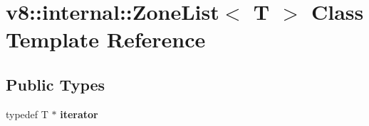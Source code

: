 \hypertarget{classv8_1_1internal_1_1ZoneList}{}\section{v8\+:\+:internal\+:\+:Zone\+List$<$ T $>$ Class Template Reference}
\label{classv8_1_1internal_1_1ZoneList}
\subsection*{Public Types}
\begin{DoxyCompactItemize}
\item 
\mbox{\label{classv8_1_1internal_1_1ZoneList_aac779d5b2f0212441129206fa7c3b4cb}} 
typedef T $\ast$ {\bfseries iterator}
\end{DoxyCompactItemize}
